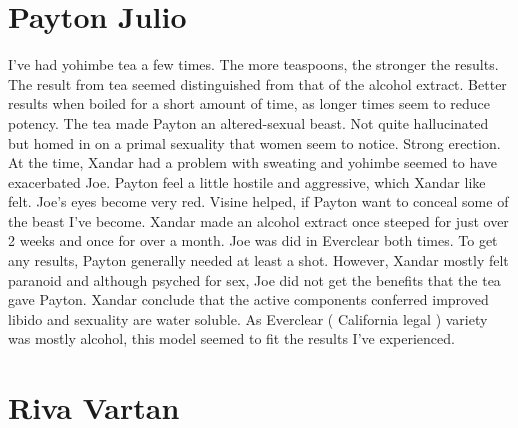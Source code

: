 \documentclass[12pt]{book}
\begin{document}
\chapter{Payton Julio}

I've had yohimbe tea a few times. The more teaspoons, the stronger the results. The result from tea seemed distinguished from that of the alcohol extract. Better results when boiled for a short amount of time, as longer times seem to reduce potency. The tea made Payton an altered-sexual beast. Not quite hallucinated but homed in on a primal sexuality that women seem to notice. Strong erection. At the time, Xandar had a problem with sweating and yohimbe seemed to have exacerbated Joe. Payton feel a little hostile and aggressive, which Xandar like felt. Joe's eyes become very red. Visine helped, if Payton want to conceal some of the beast I've become. Xandar made an alcohol extract once steeped for just over 2 weeks and once for over a month. Joe was did in Everclear both times. To get any results, Payton generally needed at least a shot. However, Xandar mostly felt paranoid and although psyched for sex, Joe did not get the benefits that the tea gave Payton. Xandar conclude that the active components conferred improved libido and sexuality are water soluble. As Everclear ( California legal ) variety was mostly alcohol, this model seemed to fit the results I've experienced.






\chapter{Riva Vartan}
\end{document}
